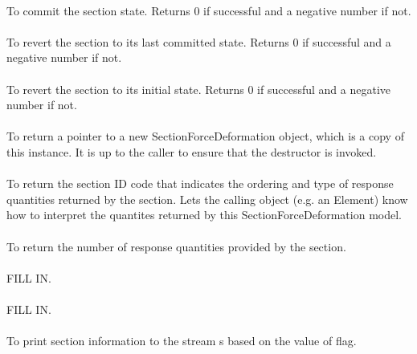  \\
To commit the section state.  Returns $0$ if successful and a negative
number if not. \\

 \\
To revert the section to its last committed state.  Returns $0$ if
successful and a negative number if not. \\

 \\
To revert the section to its initial state. Returns $0$ if successful
and a negative number if not. \\

 \\
To return a pointer to a new SectionForceDeformation object, which is a copy 
of this instance. It is up to the caller to ensure that the destructor is invoked. \\

 \\
To return the section ID code that indicates the ordering and type of
response quantities returned by the section. Lets the calling object
(e.g. an Element) know how to interpret the quantites returned by this
SectionForceDeformation model. \\

 \\
To return the number of response quantities provided by the section. \\

\\
FILL IN. \\

\\
FILL IN. \\

 \\
To print section information to the stream \p s based on the value of \p flag. \\
